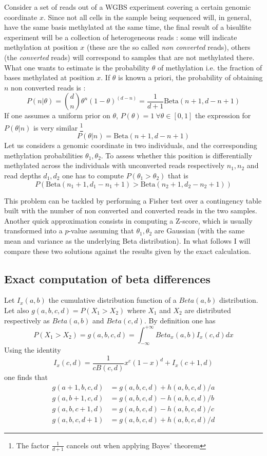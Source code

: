 \documentclass[11pt]{amsart}
\begin{document}
Consider a set of reads out of a WGBS experiment covering a certain genomic coordinate $x$. Since not all cells in the sample being sequenced will, in general,  have the same basis methylated at the same time, the final result of a bisulfite experiment will be a collection of heterogeneous reads : some will indicate methylation at position $x$ (these are the so called {\em non converted} reads), others (the {\em converted} reads) will correspond to samples that are not methylated there. What one wants to estimate is the probability $\theta$ of methylation i.e. the fraction of bases methylated at position $x$.  If $\theta$ is known a priori, the probability of obtaining $n$ non converted reads is :
\[P(n|\theta)={d \choose n}\theta^n ({1-\theta})^(d-n)=\frac{1}{d+1}\mbox{Beta}(n+1,d-n+1)\]
If one assumes a uniform prior on $\theta$, $P(\theta)=1 \ \forall \theta \in [0,1]$ the expression for $P(\theta|n)$ is very similar \footnote{The factor $\frac{1}{d+1}$ cancels out when applying Bayes' theorem}
\[P(\theta|n)=\mbox{Beta}(n+1,d-n+1)\]
Let us considers a genomic coordinate in two individuals, and the corresponding methylation probabilities $\theta_1,\theta_2$. 
To assess whether this position is differentially methylated across the individuals with unconverted reads respectively $n_1,n_2$ and read depths $d_1,d_2$ one
has to compute $P(\theta_1>\theta_2)$ that is \[P(\mbox{Beta}(n_1+1,d_1-n_1+1)>\mbox{Beta}(n_2+1,d_2-n_2+1))\]
 
This problem can be tackled by performing a Fisher test over a contingency table built with the number of non converted and converted reads in the two samples. Another quick approximation consists in computing a Z-score, which is usually transformed into a $p$-value assuming that $\theta_1,\theta_2$ are Gaussian (with the same mean and variance as the underlying Beta distribution). In what follows I will compare these two solutions against the results given by the exact calculation.
 
\subsection{Exact computation of beta differences}

Let $I_x(a,b)$ the cumulative distribution function of a $Beta(a,b)$ distribution. Let also $g(a,b,c,d)=P(X_1>X_2)$ where $X_1$ and $X_2$ are distributed respectively as $Beta(a,b)$ and $Beta(c,d)$. By definition one has \[P(X_1>X_2)=g(a,b,c,d)=\int_{-\infty}^{+\infty} Beta_x(a,b)I_x(c,d) dx\]
Using the identity \[I_x(c,d)=\frac{1}{cB(c,d)}x^c(1-x)^d+I_x(c+1,d)\] one finds that 
\begin{align}
g(a+1,b,c,d) &= g(a,b,c,d) + h(a,b,c,d)/a \\
g(a,b+1,c,d) &= g(a,b,c,d) - h(a,b,c,d)/b \\
g(a,b,c+1,d) &= g(a,b,c,d) - h(a,b,c,d)/c \\
g(a,b,c,d+1) &= g(a,b,c,d) + h(a,b,c,d)/d 
\end{align}
\end{document}
